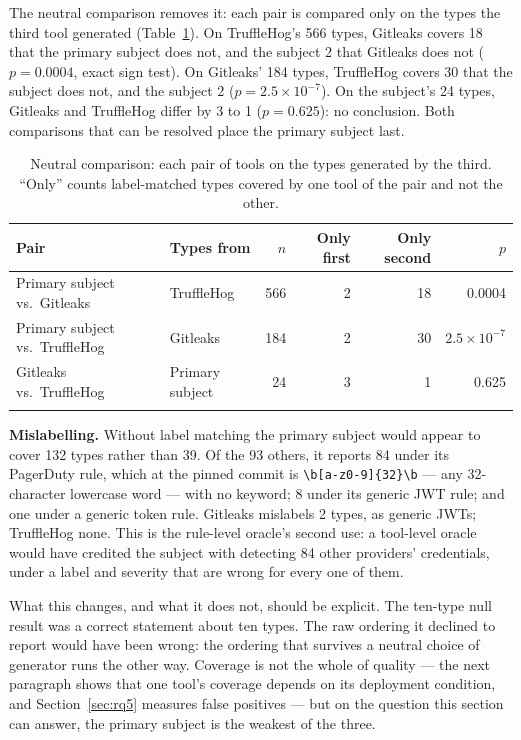 \documentclass[pdflatex,sn-basic]{sn-jnl}
\begin{document}
The neutral comparison removes it: each pair is compared only on the types the third tool generated (Table~\ref{tab:neutral}). On TruffleHog's 566 types, Gitleaks covers 18 that the primary subject does not, and the subject 2 that Gitleaks does not ($p = 0.0004$, exact sign test). On Gitleaks' 184 types, TruffleHog covers 30 that the subject does not, and the subject 2 ($p = 2.5\times10^{-7}$). On the subject's 24 types, Gitleaks and TruffleHog differ by 3 to 1 ($p = 0.625$): no conclusion. Both comparisons that can be resolved place the primary subject last.

\begin{table}[t]
\centering
\caption{Neutral comparison: each pair of tools on the types generated by the third. ``Only'' counts label-matched types covered by one tool of the pair and not the other.}
\label{tab:neutral}
\small
\setlength{\tabcolsep}{3pt}
\begin{tabular}{@{}llrrrr@{}}
\toprule
Pair & Types from & $n$ & Only first & Only second & $p$ \\
\midrule
Primary subject vs.\ Gitleaks & TruffleHog & 566 & 2 & 18 & 0.0004 \\
Primary subject vs.\ TruffleHog & Gitleaks & 184 & 2 & 30 & $2.5\times10^{-7}$ \\
Gitleaks vs.\ TruffleHog & Primary subject & 24 & 3 & 1 & 0.625 \\
\botrule
\end{tabular}
\end{table}

\textbf{Mislabelling.} Without label matching the primary subject would appear to cover 132 types rather than 39. Of the 93 others, it reports 84 under its PagerDuty rule, which at the pinned commit is \verb|\b[a-z0-9]{32}\b| --- any 32-character lowercase word --- with no keyword; 8 under its generic JWT rule; and one under a generic token rule. Gitleaks mislabels 2 types, as generic JWTs; TruffleHog none. This is the rule-level oracle's second use: a tool-level oracle would have credited the subject with detecting 84 other providers' credentials, under a label and severity that are wrong for every one of them.

What this changes, and what it does not, should be explicit. The ten-type null result was a correct statement about ten types. The raw ordering it declined to report would have been wrong: the ordering that survives a neutral choice of generator runs the other way. Coverage is not the whole of quality --- the next paragraph shows that one tool's coverage depends on its deployment condition, and Section~\ref{sec:rq5} measures false positives --- but on the question this section can answer, the primary subject is the weakest of the three.
\end{document}
